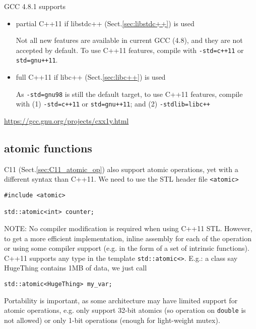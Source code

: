 GCC 4.8.1 supports
\begin{itemize}

  \item partial C++11 if libstdc++ (Sect.\ref{sec:libstdc++}) is used

Not all new features are available in current GCC (4.8), and they are not
accepted by default. To use C++11 features, compile with \verb!-std=c++11! or
\verb!std=gnu++11!.
  
  \item full C++11 if libc++ (Sect.\ref{sec:libc++}) is used

As \verb!-std=gnu98! is still the default target, to use C++11 features, compile
with (1) \verb!-std=c++11! or \verb!std=gnu++11!; and (2) \verb!-stdlib=libc++!

\end{itemize}


\url{https://gcc.gnu.org/projects/cxx1y.html}

\subsection{atomic functions}
\label{sec:C++11_atomic}

C11 (Sect.\ref{sec:C11_atomic_op}) also support atomic operations, yet with a
different syntax than C++11. We need to use the STL header file \verb!<atomic>!

\begin{lstlisting}
#include <atomic>

std::atomic<int> counter;
\end{lstlisting}

NOTE: No compiler modification is required when using C++11 STL. However, to get
a more efficient implementation, inline assembly for each of the operation or
using some compiler support (e.g. in the form of a set of intrinsic functions).
C++11 supports any type in the template \verb!std::atomic<>!. E.g.: a class say
HugeThing contains 1MB of data, we just call
\begin{verbatim}
std::atomic<HugeThing> my_var;
\end{verbatim}

\begin{mdframed}
Portability is important, as some architecture may have limited support for
atomic operations, e.g. only support 32-bit atomics (so operation on
\verb!double! is not allowed) or only 1-bit operations (enough for light-weight
mutex).
\end{mdframed}

